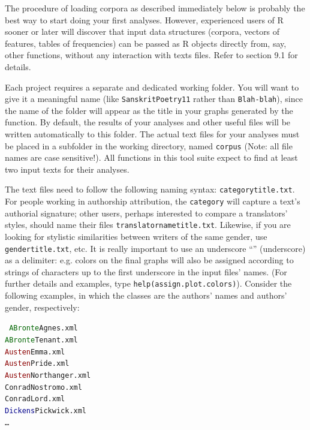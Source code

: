 \documentclass[11pt,a4paper]{article}
\def\underscore{\raisebox{-.8ex}{-}}
\def\code#1{{\tt #1}}
\begin{document}
The procedure of loading corpora as described immediately below is probably the best way to start doing your first analyses. However, experienced users of R sooner or later will discover that input data structures (corpora, vectors of features, tables of frequencies) can be passed as R objects directly from, say, other functions, without any interaction with texts files. Refer to section 9.1 for details.

Each project requires a separate and dedicated working folder. You
will want to give it a meaningful name (like \code{SanskritPoetry11}
rather than \code{Blah-blah}), since the name of the folder will
appear as the title in your graphs generated by the function. By default,
the results of your analyses and other useful files will be written
automatically to this folder. The actual text files for your analyses
must be placed in a subfolder in the working directory, named \code{corpus}
(Note: all file names are case sensitive!). All functions in this
tool suite expect to find at least two input texts for their analyses.

The text files need to follow the following naming syntax: \code{category\underscore{}title.txt}.
For people working in authorship attribution, the \code{category}
will capture a text's authorial signature; other users, perhaps interested
to compare a translators' styles, should name their files \code{translatorname\underscore{}title.txt}.
Likewise, if you are looking for stylistic similarities between writers
of the same gender, use \code{gender\underscore{}title.txt},
etc. It is really important to use an underscore ``{}\code{\underscore}''
(underscore) as a delimiter: e.g. colors on the final graphs will
also be assigned according to strings of characters up to the first
underscore in the input files' names. (For further details and examples,
type \code{help(assign.plot.colors)}). Consider the following examples,
in which the classes are the authors' names and authors' gender, respectively:

\medskip

\code{
\noindent
\textcolor{darkgreen}{ABronte}\underscore Agnes.xml \\
\textcolor{darkgreen}{ABronte}\underscore Tenant.xml \\
\textcolor{darkred}{Austen}\underscore Emma.xml \\
\textcolor{darkred}{Austen}\underscore Pride.xml \\
\textcolor{darkred}{Austen}\underscore Northanger.xml \\
\textcolor{myyellow}{Conrad}\underscore Nostromo.xml \\
\textcolor{myyellow}{Conrad}\underscore Lord.xml \\
\textcolor{darkblue}{Dickens}\underscore Pickwick.xml \\
\dots
}
\end{document}
